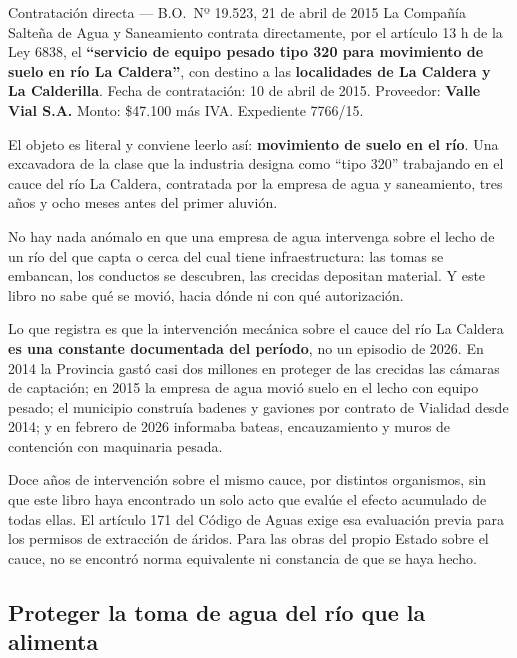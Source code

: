 \begin{ficha}{Contratación directa --- B.O.\ Nº 19.523, 21 de abril de 2015}
La Compañía Salteña de Agua y Saneamiento contrata directamente, por el artículo 13 h de la Ley 6838, el \textbf{``servicio de equipo pesado tipo 320 para movimiento de suelo en río La Caldera''}, con destino a las \textbf{localidades de La Caldera y La Calderilla}. Fecha de contratación: 10 de abril de 2015. Proveedor: \textbf{Valle Vial S.A.} Monto: \$47.100 más IVA. Expediente 7766/15.
\end{ficha}

\begin{cautela}
El objeto es literal y conviene leerlo así: \textbf{movimiento de suelo en el río}. Una excavadora de la clase que la industria designa como ``tipo 320'' trabajando en el cauce del río La Caldera, contratada por la empresa de agua y saneamiento, tres años y ocho meses antes del primer aluvión.

No hay nada anómalo en que una empresa de agua intervenga sobre el lecho de un río del que capta o cerca del cual tiene infraestructura: las tomas se embancan, los conductos se descubren, las crecidas depositan material. Y este libro no sabe qué se movió, hacia dónde ni con qué autorización.

Lo que registra es que la intervención mecánica sobre el cauce del río La Caldera \textbf{es una constante documentada del período}, no un episodio de 2026. En 2014 la Provincia gastó casi dos millones en proteger de las crecidas las cámaras de captación; en 2015 la empresa de agua movió suelo en el lecho con equipo pesado; el municipio construía badenes y gaviones por contrato de Vialidad desde 2014; y en febrero de 2026 informaba bateas, encauzamiento y muros de contención con maquinaria pesada.

Doce años de intervención sobre el mismo cauce, por distintos organismos, sin que este libro haya encontrado un solo acto que evalúe el efecto acumulado de todas ellas. El artículo 171 del Código de Aguas exige esa evaluación previa para los permisos de extracción de áridos. Para las obras del propio Estado sobre el cauce, no se encontró norma equivalente ni constancia de que se haya hecho.
\end{cautela}

\subsection*{Proteger la toma de agua del río que la alimenta}

